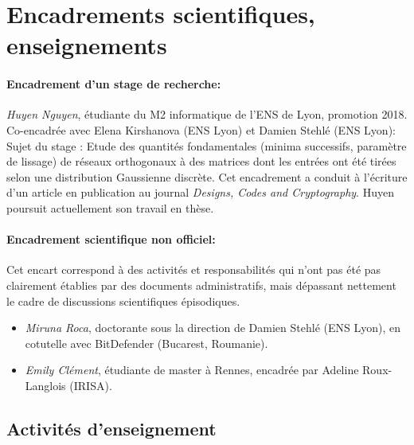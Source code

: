 \documentclass[11pt]{article}
\newcommand{\cs}{\cb{s}}
\begin{document}
\section{Encadrements scientifiques, enseignements}

  \paragraph{Encadrement d'un stage de recherche:} {\em Huyen Nguyen}, étudiante du M2 informatique de l'ENS de Lyon, promotion 2018. Co-encadrée avec Elena Kirshanova (ENS Lyon) et Damien Stehlé (ENS Lyon):\\[5pt]
    Sujet du stage : Etude des quantités fondamentales (minima successifs, paramètre de lissage) de réseaux orthogonaux à des matrices dont les entrées ont été tirées selon une distribution Gaussienne discrète. Cet encadrement a conduit à l'écriture d'un article en publication au journal {\em Designs, Codes and Cryptography}. Huyen poursuit actuellement son travail en thèse.

    \paragraph{Encadrement scientifique non officiel:}

    Cet encart correspond à des activités et responsabilités qui n'ont pas été pas clairement établies par des documents administratifs, mais dépassant nettement le cadre de discussions scientifiques épisodiques.
  
    \begin{itemize}
    \item  {\em Miruna Ro\cs ca}, doctorante sous la direction de Damien Stehlé (ENS Lyon), en cotutelle avec BitDefender (Bucarest, Roumanie).
    \item {\em Emily Clément}, étudiante de master à Rennes, encadrée par Adeline Roux-Langlois (IRISA).
    \end{itemize}
    
\newpage
\subsection*{Activités d'enseignement}
\end{document}
